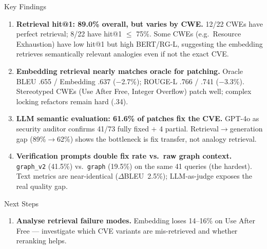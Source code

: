 \documentclass[aspectratio=169,10pt]{beamer}
\begin{document}
\begin{frame}{Key Findings}

  \begin{enumerate}\setlength{\itemsep}{0.5em}
    \item[\textcolor{c1}{\faIcon{search}}]
      \textbf{Retrieval hit@1: 89.0\% overall, but varies by CWE.}
      12/22 CWEs have perfect retrieval; 8/22 have hit@1 $\le$ 75\%.
      Some CWEs (e.g.\ Resource Exhaustion) have low hit@1 but high
      BERT/RG-L, suggesting the embedding retrieves semantically
      relevant analogies even if not the exact CVE.

    \vspace{0.3em}
    \item[\textcolor{c3}{\faIcon{robot}}]
      \textbf{Embedding retrieval nearly matches oracle for patching.}
      Oracle BLEU .655 / Embedding .637 ($-$2.7\%); ROUGE-L .766 / .741 ($-$3.3\%).
      Stereotyped CWEs (Use After Free, Integer Overflow) patch well;
      complex locking refactors remain hard (.34).

    \vspace{0.3em}
    \item[\textcolor{c4}{\faIcon{shield-alt}}]
      \textbf{LLM semantic evaluation: 61.6\% of patches fix the CVE.}
      GPT-4o as security auditor confirms 41/73 fully fixed $+$ 4 partial.
      Retrieval$\to$generation gap (89\%$\to$62\%) shows
      the bottleneck is fix transfer, not analogy retrieval.

    \vspace{0.3em}
    \item[\textcolor{c3}{\faIcon{exchange-alt}}]
      \textbf{Verification prompts double fix rate vs.\ raw graph context.}
      \texttt{graph\_v2} (41.5\%) vs.\ \texttt{graph} (19.5\%) on the
      same 41 queries (the hardest). Text metrics are near-identical ($\Delta$BLEU~2.5\%);
      LLM-as-judge exposes the real quality gap.

  \end{enumerate}
\end{frame}


\begin{frame}{Next Steps}

  \begin{enumerate}\setlength{\itemsep}{0.5em}

    \item[\textcolor{c1}{\faIcon{search}}]
      \textbf{Analyse retrieval failure modes.}
      Embedding loses 14--16\% on Use After Free --- investigate
      which CVE variants are mis-retrieved and whether reranking helps.

  \end{enumerate}
\end{frame}
\end{document}
